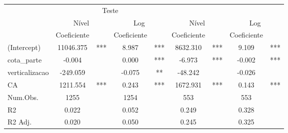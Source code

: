 \begingroup
\fontsize{12.0pt}{14.4pt}\selectfont
\begin{longtable}{lcccccccc}
\toprule
 & \multicolumn{4}{c}{Teste} &  &  &  &  \\ 
\cmidrule(lr){2-5}
 & \multicolumn{2}{c}{Nível    } & \multicolumn{2}{c}{Log    } & \multicolumn{2}{c}{Nível​    } & \multicolumn{2}{c}{Log​    } \\ 
\cmidrule(lr){2-3} \cmidrule(lr){4-5} \cmidrule(lr){6-7} \cmidrule(lr){8-9}
  & Coeficiente & ​ & Coeficiente  & ​  & Coeficiente   & ​   & Coeficiente    & ​    \\ 
\midrule\addlinespace[2.5pt]
(Intercept) & 11046.375 & *** & 8.987 & *** & 8632.310 & *** & 9.109 & *** \\ 
cota\_parte & -0.004 &  & 0.000 & *** & -6.973 & *** & -0.002 & *** \\ 
verticalizacao & -249.059 &  & -0.075 & ** & -48.242 &  & -0.026 &  \\ 
{CA} & {1211.554} & {***} & {0.243} & {***} & {1672.931} & {***} & {0.143} & {***} \\ 
Num.Obs. & 1255 &  & 1254 &  & 553 &  & 553 &  \\ 
R2 & 0.022 &  & 0.052 &  & 0.249 &  & 0.328 &  \\ 
R2 Adj. & 0.020 &  & 0.050 &  & 0.245 &  & 0.325 &  \\ 
\bottomrule
\end{longtable}
\endgroup

